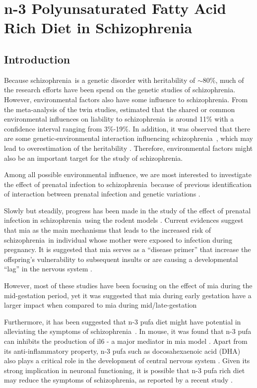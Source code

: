 \documentclass[12pt]{scrbook}
\newcommand*{\scz}{schizophrenia}
\begin{document}
\chapter{n-3 Polyunsaturated Fatty Acid Rich Diet in Schizophrenia}
\label{omegaProject}
\section{Introduction}
Because \scz\ is a genetic disorder with heritability of $\sim80\%$, much of the research efforts have been spend on the genetic studies of \scz.
However, environmental factors also have some influence to \scz.
From the meta-analysis of the twin studies, \citet{Sullivan2003} estimated that the shared or common environmental influences on liability to \scz\ is around 11\% with a confidence interval ranging from 3\%-19\%.
In addition, it was observed that there are some genetic-environmental interaction influencing \scz\ \citep{Tienari2004,Clarke2009},  which may lead to overestimation of the heritability \citet{zuk2012mystery}. 
Therefore, environmental factors might also be an important target for the study of \scz.

Among all possible environmental influence, we are most interested to investigate the effect of prenatal infection to \scz\ because of previous identification of interaction between prenatal infection and genetic variations \citep{Clarke2009}.

Slowly but steadily, progress has been made in the study of the effect of prenatal infection in \scz\ using the rodent models \citep{Oskvig2012,Smith2007,Garbett2012a}.
Current evidences suggest that \gls{mia} as the main mechanisms that leads to the increased risk of \scz\ in individual whose mother were exposed to infection during pregnancy.
It is suggested that \gls{mia} serves as a ``disease primer'' that increase the offspring's vulnerability to subsequent insults \citep{Giovanoli2013} or are causing a developmental ``lag'' in the nervous system \citep{Meyer2007a,Garbett2012a}.

However, most of these studies have been focusing on the effect of \gls{mia} during the mid-gestation period, yet it was suggested that \gls{mia} during early gestation have a larger impact when compared to \gls{mia} during mid/late-gestation \citep{Meyer2007a,Li2010a}

Furthermore, it has been suggested that n-3 \gls{pufa} diet might have potential in alleviating the symptoms of \scz\ \citep{Li2015,Trebble2003}. 
In mouse, it was found that n-3 \gls{pufa} can inhibits the production of \gls{il6} \citep{Trebble2003} - a major mediator in \gls{mia} model \citep{Smith2007}.
Apart from its anti-inflammatory property, n-3 \gls{pufa} such as docosahexaenoic acid (DHA) also plays a critical role in the development of central nervous system \citep{Clandinin1999,Kitajka2002}.
Given its strong implication in neuronal functioning, it is possible that n-3 \gls{pufa} rich diet may reduce the symptoms of \scz, as reported by a recent study \citep{Li2015}.
\end{document}
